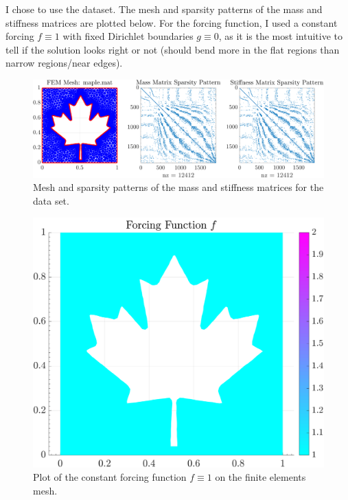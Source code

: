 \begin{problem}{2}
\begin{itemize}
\begin{solution}
I chose to use the  dataset.
The mesh and sparsity patterns of the mass and stiffness matrices are plotted below.
For the forcing function, I used a constant forcing $f\equiv 1$ with fixed Dirichlet boundaries $g \equiv 0$, as it is the most intuitive to tell if the solution looks right or not (should bend more in the flat regions than narrow regions/near edges).

\vspace{0.7cm}
\begin{figure}[ht]
\centering
\includegraphics[width=1.0\textwidth]{../maple-mesh}
\caption{Mesh and sparsity patterns of the mass and stiffness matrices for the  data set.}\label{maple-mesh}
\end{figure}

\pagebreak
\begin{figure}[ht]
\centering
\includegraphics[width=1.0\textwidth]{../maple-const-force}
\caption{Plot of the constant forcing function $f\equiv 1$ on the  finite elements mesh.}\label{maple-const-force}
\end{figure}


\end{solution}
\end{itemize}
\end{problem}
